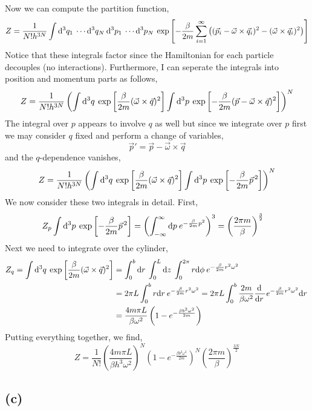 \documentclass[12pt]{extarticle}
\begin{document}
Now we can compute the partition function,
\[ Z = \frac{1}{N! h^{3N}} \int \mathrm{d}^{3} q_1 \: \cdots \mathrm{d}^{3} q_N \: \mathrm{d}^{3} p_1 \: \cdots \mathrm{d}^{3} p_N \: \exp{\left[ - \frac{\beta}{2 m} \sum_{i = 1}^{\infty} \left( (\vec{p}_i - \vec{\omega} \times \vec{q}_i)^2 - (\vec{\omega} \times \vec{q}_i)^2 \right) \right]} \]
Notice that these integrals factor since the Hamiltonian for each particle decouples (no interactions). Furthermore, I can seperate the integrals into position and momentum parts as follows,
\[ Z = \frac{1}{N! h^{3 N}} \left( \int \mathrm{d}^{3} q \: \exp{\left[ \frac{\beta}{2 m} (\vec{\omega} \times \vec{q})^2 \right]} \int \mathrm{d}^{3} p \: \exp{\left[ - \frac{\beta}{2 m}  (\vec{p} - \vec{\omega} \times \vec{q})^2 \right]}   \right)^N \]
The integral over $p$ appears to involve $q$ as well but since we integrate over $p$ first we may consider $q$ fixed and perform a change of variables, 
\[ \vec{p}' = \vec{p} - \vec{\omega} \times \vec{q} \]
and the $q$-dependence vanishes,
\[ Z = \frac{1}{N! h^{3 N}} \left( \int \mathrm{d}^{3} q \: \exp{\left[ \frac{\beta}{2 m} (\vec{\omega} \times \vec{q})^2 \right]} \int \mathrm{d}^{3} p \: \exp{\left[ - \frac{\beta}{2 m} \vec{p}^{\, 2} \right]}   \right)^N \]
We now consider these two integrals in detail. First,
\begin{align*}
Z_p \int \mathrm{d}^{3} p \: \exp{\left[ - \frac{\beta}{2 m} \vec{p}^{\, 2} \right]}  & = \left( \int_{-\infty}^{\infty} \mathrm{d}p \: e^{-\frac{\beta}{2m} p^2} \right)^3 = \left( \frac{2 \pi m}{\beta} \right)^{\frac{3}{2}}
\end{align*} 
Next we need to integrate over the cylinder,
\begin{align*}
Z_q = \int \mathrm{d}^{3} q \: \exp{\left[ \frac{\beta}{2 m} (\vec{\omega} \times \vec{q})^2 \right]} & = \int_0^{b} \mathrm{d}r \: \int_{0}^L \mathrm{d}z \: \int_0^{2 \pi} r \mathrm{d}\phi \: e^{-\frac{\beta}{2 m} r^2 \omega^2} 
\\
& = 2 \pi L \int_0^b r \mathrm{d}r \: e^{-\frac{\beta}{2 m} r^2 \omega^2} = 2 \pi L \int_0^b  \frac{2 m}{\beta \omega^2} \frac{\mathrm{d} \:}{\mathrm{d}r \:} e^{-\frac{\beta}{2 m} r^2 \omega^2} \mathrm{d}r \:
\\
& = \frac{4 m \pi L}{\beta \omega^2} \left(1 - e^{-\frac{\beta b^2 \omega^2}{2m}} \right)
\end{align*}
Putting everything together, we find,
\[ Z = \frac{1}{N!} \left( \frac{4 m \pi L}{\beta h^3 \omega^2} \right)^N \left(1 - e^{-\frac{\beta b^2 \omega^2}{2m}} \right)^N \left( \frac{2 \pi m}{\beta} \right)^{\frac{3N}{2}} \]

\subsection*{(c)}
\end{document}
